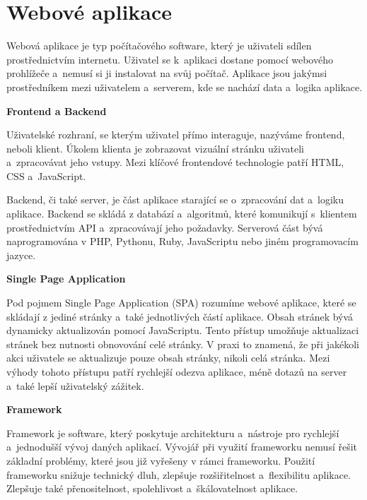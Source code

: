 \section{Webové aplikace}

Webová aplikace je typ počítačového software, který je uživateli sdílen prostřednictvím internetu. 
Uživatel se k~aplikaci dostane pomocí webového prohlížeče a~nemusí si ji instalovat na svůj počítač. 
Aplikace jsou jakýmsi prostředníkem mezi uživatelem a~serverem, kde se nachází data a~logika aplikace.\cite{codeacademywebapp}

\begin{flushleft}
  \textbf{Frontend a Backend}
\end{flushleft}

Uživatelské rozhraní, se kterým uživatel přímo interaguje, nazýváme frontend, neboli klient.
Úkolem klienta je zobrazovat vizuální stránku uživateli a~zpracovávat jeho vstupy. 
Mezi klíčové frontendové technologie patří HTML, CSS a~JavaScript.

Backend, či také server, je část aplikace starající se o~zpracování dat a~logiku aplikace. 
Backend se skládá z databází a~algoritmů, které komunikují s~klientem prostřednictvím API a~zpracovávají jeho požadavky. 
Serverová část bývá naprogramována v PHP, Pythonu, Ruby, JavaScriptu nebo jiném programovacím jazyce.\cite{stateofartframeworks}

\begin{flushleft}
  \textbf{Single Page Application}
\end{flushleft}

Pod pojmem Single Page Application (SPA) rozumíme webové aplikace, které se skládají z jediné stránky a~také jednotlivých částí aplikace. 
Obsah stránek bývá dynamicky aktualizován pomocí JavaScriptu. Tento přístup umožňuje aktualizaci stránek bez nutnosti obnovování celé stránky. 
V praxi to znamená, že při jakékoli akci uživatele se aktualizuje pouze obsah stránky, nikoli celá stránka. 
Mezi výhody tohoto přístupu patří rychlejší odezva aplikace, méně dotazů na server a~také lepší uživatelský zážitek.\cite{jadhavspa}

\begin{flushleft}
  \textbf{Framework}
\end{flushleft}

Framework je software, který poskytuje architekturu a~nástroje pro rychlejší a~jednodušší vývoj daných aplikací. 
Vývojář při využití frameworku nemusí řešit základní problémy, které jsou již vyřešeny v rámci frameworku. 
Použití frameworku snižuje technický dluh, zlepšuje rozšiřitelnost a~flexibilitu aplikace. 
Zlepšuje také přenositelnost, spolehlivost a~škálovatelnost aplikace.\cite{schmidtframeworks}